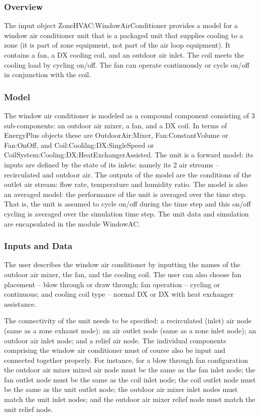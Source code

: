 \subsubsection{Overview}\label{overview-5-002}

The input object ZoneHVAC:WindowAirConditioner provides a model for a window air conditioner unit that is a packaged unit that supplies cooling to a zone (it is part of zone equipment, not part of the air loop equipment). It contains a fan, a DX cooling coil, and an outdoor air inlet. The coil meets the cooling load by cycling on/off. The fan can operate continuously or cycle on/off in conjunction with the coil.

\subsubsection{Model}\label{model-4}

The window air conditioner is modeled as a compound component consisting of 3 sub-components: an outdoor air mixer, a fan, and a DX coil. In terms of EnergyPlus objects these are OutdoorAir:Mixer, Fan:ConstantVolume or Fan:OnOff, and Coil:Coolilng:DX:SingleSpeed or CoilSystem:Cooling:DX:HeatExchangerAssisted. The unit is a forward model: its inputs are defined by the state of its inlets: namely its 2 air streams -- recirculated and outdoor air. The outputs of the model are the conditions of the outlet air stream: flow rate, temperature and humidity ratio. The model is also an averaged model: the performance of the unit is averaged over the time step. That is, the unit is assumed to cycle on/off during the time step and this on/off cycling is averaged over the simulation time step. The unit data and simulation are encapsulated in the module WindowAC.

\subsubsection{Inputs and Data}\label{inputs-and-data-5}

The user describes the window air conditioner by inputting the names of the outdoor air mixer, the fan, and the cooling coil. The user can also choose fan placement -- blow through or draw through; fan operation -- cycling or continuous; and cooling coil type -- normal DX or DX with heat exchanger assistance.

The connectivity of the unit needs to be specified: a recirculated (inlet) air node (same as a zone exhaust node); an air outlet node (same as a zone inlet node); an outdoor air inlet node; and a relief air node. The individual components comprising the window air conditioner must of course also be input and connected together properly. For instance, for a blow through fan configuration the outdoor air mixer mixed air node must be the same as the fan inlet node; the fan outlet node must be the same as the coil inlet node; the coil outlet node must be the same as the unit outlet node; the outdoor air mixer inlet nodes must match the unit inlet nodes; and the outdoor air mixer relief node must match the unit relief node.

